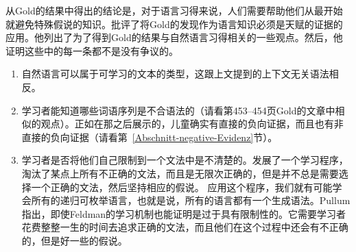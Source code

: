 从Gold的结果中得出的结论是，对于语言习得来说，人们需要帮助他们从最开始就避免特殊假说的知识。批评了将Gold的发现作为语言知识必须是天赋的证据的应用。他列出了为了得到Gold的结果与自然语言习得相关的一些观点。然后，他证明这些中的每一条都不是没有争议的。

\begin{enumerate}
\item 自然语言可以属于可学习的文本的类型，这跟上文提到的上下文无关语法相反。

\item 学习者能知道哪些词语序列是不合语法的（请看第453--454页Gold的文章中相似的观点）。正如在那之后展示的，儿童确实有直接的负向证据，而且也有非直接的负向证据（请看第~\ref{Abschnitt-negative-Evidenz}节）。

\item 学习者是否将他们自己限制到一个文法中是不清楚的。\citet{Feldman72a}发展了一个学习程序，淘汰了某点上所有不正确的文法，而且是无限次正确的，但是并不总是需要选择一个正确的文法，然后坚持相应的假说。
应用这个程序，我们就有可能学会所有的递归可枚举语言，也就是说，所有的语言都有一个生成语法。Pullum指出，即使Feldman的学习机制也能证明是过于具有限制性的。它需要学习者花费整整一生的时间去追求正确的文法，而且他们在这个过程中还会有不正确的，但是好一些的假说。


\end{enumerate}
